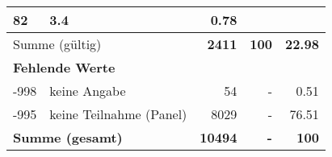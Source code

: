\begin{longtable}{lXrrr}
       \num{82} &
       \num[round-mode=places,round-precision=2]{3.4} &
         \num[round-mode=places,round-precision=2]{0.78} \\
     \midrule
     \multicolumn{2}{l}{Summe (gültig)} &
       \textbf{\num{2411}} &
     \textbf{\num{100}} &
       \textbf{\num[round-mode=places,round-precision=2]{22.98}} \\
     \multicolumn{5}{l}{\textbf{Fehlende Werte}}\\
       -998 &
       keine Angabe &
         \num{54} &
        - &
         \num[round-mode=places,round-precision=2]{0.51} \\
       -995 &
       keine Teilnahme (Panel) &
         \num{8029} &
        - &
         \num[round-mode=places,round-precision=2]{76.51} \\
     \midrule
     \multicolumn{2}{l}{\textbf{Summe (gesamt)}} &
          \textbf{\num{10494}} &
        \textbf{-} &
        \textbf{\num{100}} \\
     \bottomrule
     \end{longtable}
     
